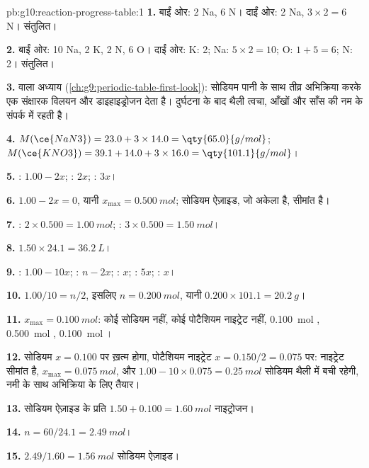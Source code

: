 \begin{solution}{pb:g10:reaction-progress-table:1}
\textbf{1.} बाईं ओर: 2 Na, 6 N। दाईं ओर: 2 Na, $3 \times 2 = 6$ N। संतुलित।

\textbf{2.} बाईं ओर: 10 Na, 2 K, 2 N, 6 O। दाईं ओर: K: 2; Na: $5 \times 2 =
10$; O: $1 + 5 = 6$; N: 2। संतुलित।

\textbf{3.}  वाला अध्याय (\cref{ch:g9:periodic-table-first-look}):
सोडियम पानी के साथ तीव्र अभिक्रिया करके एक संक्षारक विलयन और
डाइहाइड्रोजन देता है। दुर्घटना के बाद थैली त्वचा, आँखों और साँस की नम  के
संपर्क में रहती है।

\textbf{4.} $M(\ce{NaN3}) = 23.0 + 3 \times 14.0 = \qty{65.0}{g/mol}$;
$M(\ce{KNO3}) = 39.1 + 14.0 + 3 \times 16.0 = \qty{101.1}{g/mol}$।

\textbf{5.} : $1.00 - 2x$; : $2x$; : $3x$।

\textbf{6.} $1.00 - 2x = 0$, यानी $x_{\max} = \qty{0.500}{mol}$; सोडियम
ऐज़ाइड, जो अकेला  है, सीमांत है।

\textbf{7.} : $2 \times 0.500 = \qty{1.00}{mol}$; :
$3 \times 0.500 = \qty{1.50}{mol}$।

\textbf{8.} $1.50 \times 24.1 = \qty{36.2}{L}$।

\textbf{9.} : $1.00 - 10x$; : $n - 2x$; : $x$;
: $5x$; : $x$।

\textbf{10.} $1.00/10 = n/2$, इसलिए $n = \qty{0.200}{mol}$, यानी
$0.200 \times 101.1 = \qty{20.2}{g}$।

\textbf{11.} $x_{\max} = \qty{0.100}{mol}$: कोई सोडियम नहीं, कोई पोटैशियम
नाइट्रेट नहीं, \qty{0.100}{mol} , \qty{0.500}{mol} ,
\qty{0.100}{mol} ।

\textbf{12.} सोडियम $x = 0.100$ पर ख़त्म होगा, पोटैशियम नाइट्रेट
$x = 0.150/2 = 0.075$ पर: नाइट्रेट सीमांत है, $x_{\max} =
\qty{0.075}{mol}$, और $1.00 - 10 \times 0.075 = \qty{0.25}{mol}$ सोडियम
 थैली में बची रहेगी, नमी के साथ अभिक्रिया के लिए तैयार।

\textbf{13.} सोडियम ऐज़ाइड के प्रति  $1.50 + 0.100 = \qty{1.60}{mol}$
नाइट्रोजन।

\textbf{14.} $n = 60 / 24.1 = \qty{2.49}{mol}$।

\textbf{15.} $2.49 / 1.60 = \qty{1.56}{mol}$ सोडियम ऐज़ाइड।


\end{solution}
